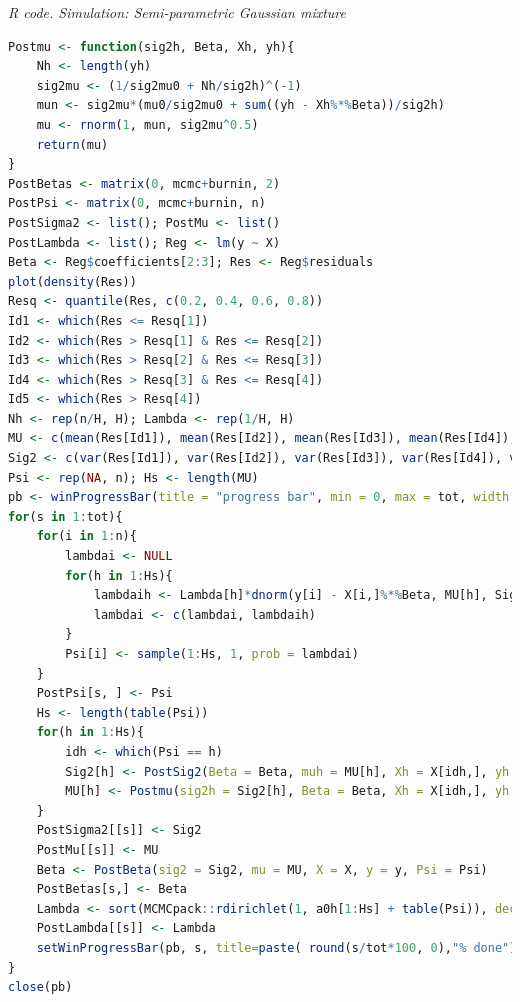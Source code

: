 \begin{enumerate}[leftmargin=*]
\begin{tcolorbox}[enhanced,width=4.67in,center upper,
	fontupper=\large\bfseries,drop shadow southwest,sharp corners]
	\textit{R code. Simulation: Semi-parametric Gaussian mixture}
	\begin{VF}
		\begin{lstlisting}[language=R]
Postmu <- function(sig2h, Beta, Xh, yh){
	Nh <- length(yh)
	sig2mu <- (1/sig2mu0 + Nh/sig2h)^(-1)
	mun <- sig2mu*(mu0/sig2mu0 + sum((yh - Xh%*%Beta))/sig2h)
	mu <- rnorm(1, mun, sig2mu^0.5)
	return(mu)
}
PostBetas <- matrix(0, mcmc+burnin, 2)
PostPsi <- matrix(0, mcmc+burnin, n)
PostSigma2 <- list(); PostMu <- list()
PostLambda <- list(); Reg <- lm(y ~ X)
Beta <- Reg$coefficients[2:3]; Res <- Reg$residuals
plot(density(Res))
Resq <- quantile(Res, c(0.2, 0.4, 0.6, 0.8))
Id1 <- which(Res <= Resq[1])
Id2 <- which(Res > Resq[1] & Res <= Resq[2])
Id3 <- which(Res > Resq[2] & Res <= Resq[3])
Id4 <- which(Res > Resq[3] & Res <= Resq[4])
Id5 <- which(Res > Resq[4])
Nh <- rep(n/H, H); Lambda <- rep(1/H, H)
MU <- c(mean(Res[Id1]), mean(Res[Id2]), mean(Res[Id3]), mean(Res[Id4]), mean(Res[Id5]))
Sig2 <- c(var(Res[Id1]), var(Res[Id2]), var(Res[Id3]), var(Res[Id4]), var(Res[Id5]))
Psi <- rep(NA, n); Hs <- length(MU)
pb <- winProgressBar(title = "progress bar", min = 0, max = tot, width = 300)
for(s in 1:tot){
	for(i in 1:n){
		lambdai <- NULL
		for(h in 1:Hs){
			lambdaih <- Lambda[h]*dnorm(y[i] - X[i,]%*%Beta, MU[h], Sig2[h]^0.5)
			lambdai <- c(lambdai, lambdaih)
		}
		Psi[i] <- sample(1:Hs, 1, prob = lambdai)
	}
	PostPsi[s, ] <- Psi
	Hs <- length(table(Psi))
	for(h in 1:Hs){
		idh <- which(Psi == h)
		Sig2[h] <- PostSig2(Beta = Beta, muh = MU[h], Xh = X[idh,], yh = y[idh])
		MU[h] <- Postmu(sig2h = Sig2[h], Beta = Beta, Xh = X[idh,], yh = y[idh])
	}
	PostSigma2[[s]] <- Sig2
	PostMu[[s]] <- MU 
	Beta <- PostBeta(sig2 = Sig2, mu = MU, X = X, y = y, Psi = Psi)
	PostBetas[s,] <- Beta
	Lambda <- sort(MCMCpack::rdirichlet(1, a0h[1:Hs] + table(Psi)), decreasing = TRUE)
	PostLambda[[s]] <- Lambda
	setWinProgressBar(pb, s, title=paste( round(s/tot*100, 0),"% done"))
}
close(pb)
\end{lstlisting}
	\end{VF}
\end{tcolorbox}


\end{enumerate}
